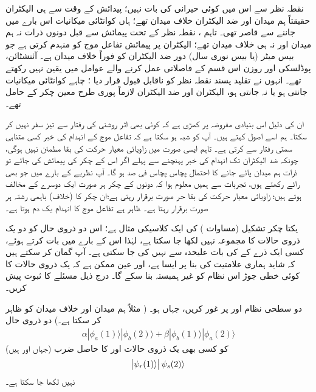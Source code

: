   نقطہ نظر سے اس میں کوئی حیرانی کی بات نہیں؛  پیدائش کے وقت سے ہی الیکٹران حقیقتاً ہم میدان  اور ضد الیکٹران خلاف میدان تھے؛   ہاں کوانٹائی میکانیات اس  بارے میں جاننے سے قاصر تھی۔ تاہم ،   نقطہ نظر کے تحت پیمائش سے قبل دونوں ذرات نہ ہم میدان اور نہ ہی خلاف میدان تھے؛  الیکٹران پر پیمائش تفاعل موج کو منہدم کرتی ہے جو  بیس میٹر (یا بیس نوری سال)  دور ضد الیکٹران کو فوراً  خلاف میدان   ہے۔ آئنشٹائن،  پوڈلسکی اور روزن اس قسم کے فاصلاتی  عمل کرنے والے عوامل میں یقین نہیں رکھتے تھے۔  انہوں نے تقلید پسند نقطہ نظر کو ناقابل قبول قرار دیا ؛ چاہے کوانٹائی میکانیات جانتی  ہو یا نہ جانتی ہو،  الیکٹران اور ضد الیکٹران لازماً  پوری طرح معین  چکر کے حامل تھے۔ 

ان کی دلیل اس بنیادی مفروضہ پر کھڑی ہے کہ کوئی بھی  اثر روشنی کی رفتار سے تیز سفر نہیں کر سکتا۔ ہم اسے اصول    کہتے ہیں۔ آپ کو شبہ ہو سکتا ہے کہ تفاعل موج کے انہدام کی خبر کسی متناہی سمتی رفتار سے   کرتی ہے۔ تاہم ایسی صورت میں زاویائی معیار حرکت کی بقا مطمئن نہیں ہوگی،  چونکہ ضد الیکٹران تک انہدام کی خبر پہنچنے سے پہلے اگر  اس کے چکر کی پیمائش کی جائے  تو     ذرات   ہم میدان پائے جانے کا احتمال پچاس پچاس فی صد  ہو گا۔ آپ  نظریے کے بارے میں  جو بھی رائے رکھتے ہوں، تجربات سے ہمیں معلوم ہوا کہ دونوں کے چکر ہر صورت ایک دوسرے کے  مخالف  ہوتے ہیں؛  زاویائی معیار حرکت کی بقا حر صورت برقرار رہتی ہے؛ان  چکر کا (خلاف) باہمی رشتہ  ہر صورت برقرار رہتا ہے۔ ظاہر ہے تفاعل موج کا انہدام یک دم ہوتا ہے۔

 یکتا چکر تشکیل   (مساوات )     کی ایک کلاسیکی مثال  ہے؛  اس دو ذروی  حال کو دو یک ذروی حالات کا مجموعہ نہیں لکھا جا سکتا ہے،  لہٰذا اس  کے بارے میں بات کرتے ہوئے،  کسی ایک ذرے کے    کی بات  علیحدہ سے نہیں کی جا سکتی ہے۔ آپ گمان کر سکتے ہیں کہ شاید  ہماری علامتیت کی بنا پر ایسا  ہے،  اور عین ممکن ہے کہ یک ذروی  حالات کا کوئی خطی جوڑ اس نظام کو غیر ہمبستہ بنا  سکے گا۔  درج ذیل مسئلے کا ثبوت پیش کریں۔

دو سطحی  نظام  اور  پر غور کریں،  جہاں  ہو۔
( مثلاً  ہم میدان اور  خلاف میدان کو ظاہر کر سکتا ہے۔) دو ذروی حال 
\begin{align*}
	\alpha|\phi_a(1)\rangle|\phi_b(2)\rangle+\beta|\phi_b(1)\rangle|\phi_a(2)\rangle
\end{align*}
(جہاں  اور  ہیں)  کو کسی بھی یک ذروی حالات  اور  کا حاصل ضرب
\begin{align*}
	\abs{\psi_r(1)\rangle}\psi_s(2)\rangle
\end{align*}
نہیں لکھا جا سکتا ہے۔

